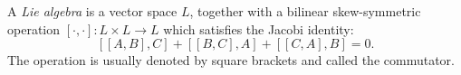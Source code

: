 A \textit{Lie algebra} is a vector space $L$, together with a bilinear skew-symmetric operation $[\cdot,\cdot]: L \times L \rightarrow L$ which satisfies the Jacobi identity:
$$[ [A, B], C] + [ [B, C], A] + [ [C, A], B] = 0.$$
The operation is usually denoted by square brackets and called the commutator.
